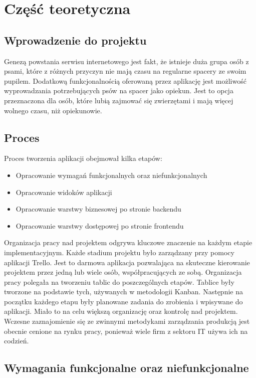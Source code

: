 \chapter{Część teoretyczna}
\section{Wprowadzenie do projektu}
Genezą powstania serwisu internetowego jest fakt, że istnieje duża grupa osób z psami, które z różnych przyczyn nie mają czasu na regularne spacery ze swoim pupilem. Dodatkową funkcjonalnością oferowaną przez aplikację jest możliwość wyprowadzania potrzebujących psów na spacer jako opiekun. Jest to opcja przeznaczona dla osób, które lubią zajmować się zwierzętami i mają więcej wolnego czasu, niż opiekunowie.

\section{Proces}
Proces tworzenia aplikacji obejmował kilka etapów:
\begin{itemize}
    \item Opracowanie wymagań funkcjonalnych oraz niefunkcjonalnych
    \item Opracowanie widoków aplikacji
    \item Opracowanie warstwy biznesowej po stronie backendu
    \item Opracowanie warstwy dostępowej po stronie frontendu
\end{itemize}

Organizacja pracy nad projektem odgrywa kluczowe znaczenie na każdym etapie implementacyjnym. Każde stadium projektu było zarządzany przy pomocy aplikacji Trello. Jest to darmowa aplikacja pozwalająca na skuteczne kierowanie projektem przez jedną lub wiele osób, współpracujących ze sobą. Organizacja pracy polegała na tworzeniu tablic do poszczególnych etapów. Tablice były tworzone na podstawie tych, używanych w metodologii Kanban. Następnie na początku każdego etapu były planowane zadania do zrobienia i wpisywane do aplikacji. Miało to na celu większą organizację oraz kontrolę nad projektem. Wczesne zaznajomienie się ze zwinnymi metodykami zarządzania produkcją jest obecnie cenione na rynku pracy, ponieważ wiele firm z sektoru IT używa ich na codzień.
\section{Wymagania funkcjonalne oraz niefunkcjonalne}

